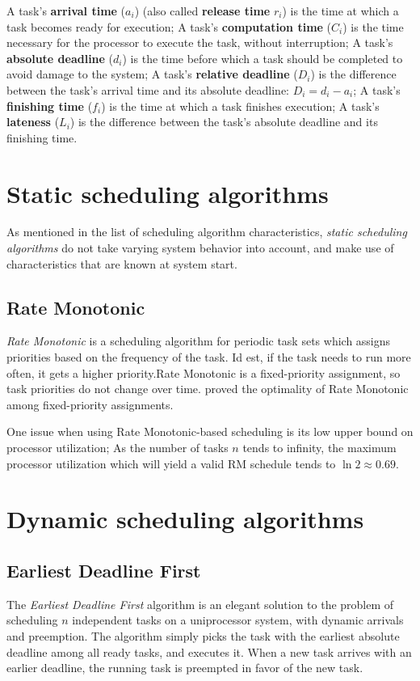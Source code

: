 \documentclass[twoside]{uva-inf-bachelor-thesis}
\begin{document}
\begin{outline}
    \1 A task's \textbf{arrival time} ($a_i$) (also called \textbf{release time} $r_i$) is the time at which a task becomes ready for execution;
    \1 A task's \textbf{computation time} ($C_i$) is the time necessary for the processor to execute the task, without interruption;
    \1 A task's \textbf{absolute deadline} ($d_i$) is the time before which a task should be completed to avoid damage to the system;
    \1 A task's \textbf{relative deadline} ($D_i$) is the difference between the task's arrival time and its absolute deadline: $D_i = d_i - a_i$;
    \1 A task's \textbf{finishing time} ($f_i$) is the time at which a task finishes execution;
    \1 A task's \textbf{lateness} ($L_i$) is the difference between the task's absolute deadline and its finishing time.
\end{outline}

\section{Static scheduling algorithms}
As mentioned in the list of scheduling algorithm characteristics, \emph{static scheduling algorithms} do not take varying system behavior into account, and make use of characteristics that are known at system start. 

\subsection{Rate Monotonic}
\emph{Rate Monotonic} is a scheduling algorithm for periodic task sets which assigns priorities based on the frequency of the task. Id est, if the task needs to run more often, it gets a higher priority.Rate Monotonic is a fixed-priority assignment, so task priorities do not change over time. \textcite{Liu1973} proved the optimality of Rate Monotonic among fixed-priority assignments.

One issue when using Rate Monotonic-based scheduling is its low upper bound on processor utilization; As the number of tasks $n$ tends to infinity, the maximum processor utilization which will yield a valid RM schedule tends to $\ln 2 \approx 0.69$.

\section{Dynamic scheduling algorithms}

\subsection{Earliest Deadline First}
The \emph{Earliest Deadline First} algorithm is an elegant solution to the problem of scheduling $n$ independent tasks on a uniprocessor system, with dynamic arrivals and preemption. The algorithm simply picks the task with the earliest absolute deadline among all ready tasks, and executes it. When a new task arrives with an earlier deadline, the running task is preempted in favor of the new task.
\end{document}
